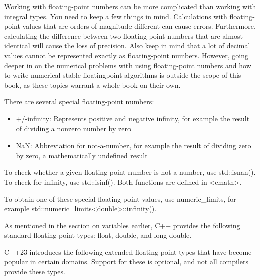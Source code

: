 
Working with floating-point numbers can be more complicated than working with integral types. You need to keep a few things in mind. Calculations with floating-point values that are orders of magnitude different can cause errors. Furthermore, calculating the difference between two floating-point numbers that are almost identical will cause the loss of precision. Also keep in mind that a lot of decimal values cannot be represented exactly as floating-point numbers. However, going deeper in on the numerical problems with using floating-point numbers and how to write numerical stable floatingpoint algorithms is outside the scope of this book, as these topics warrant a whole book on their own.

There are several special floating-point numbers:

\begin{itemize}
\item
+/-infinity: Represents positive and negative infinity, for example the result of dividing a nonzero number by zero

\item
NaN: Abbreviation for not-a-number, for example the result of dividing zero by zero, a mathematically undefined result
\end{itemize}

To check whether a given floating-point number is not-a-number, use std::isnan(). To check for infinity, use std::isinf(). Both functions are defined in <cmath>.

To obtain one of these special floating-point values, use numeric\_limits, for example std::numeric\_limits<double>::infinity().



As mentioned in the section on variables earlier, C++ provides the following standard floating-point types: float, double, and long double.

C++23 introduces the following extended floating-point types that have become popular in certain domains. Support for these is optional, and not all compilers provide these types.

